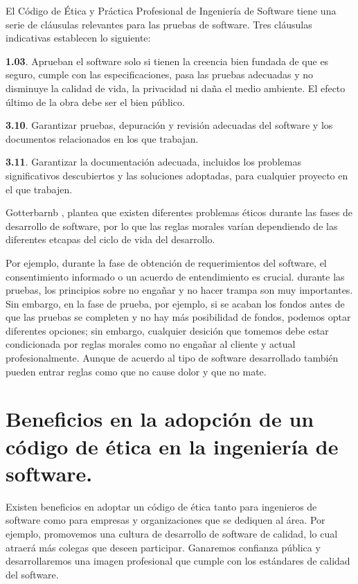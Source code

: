 \documentclass[twoside]{article}
\begin{document}
\begin{multicols}{2}
El Código de Ética y Práctica Profesional de Ingeniería de Software tiene una
serie de cláusulas relevantes para las pruebas de software. Tres cláusulas
indicativas establecen lo siguiente:

\textbf{1.03}. Aprueban el software solo si tienen la creencia bien fundada de que es
seguro, cumple con las especificaciones, pasa las pruebas adecuadas y no
disminuye la calidad de vida, la privacidad ni daña el medio ambiente. El efecto
último de la obra debe ser el bien público.

\textbf{3.10}. Garantizar pruebas, depuración y revisión adecuadas del software
y los documentos relacionados en los que trabajan.

\textbf{3.11}. Garantizar la documentación adecuada, incluidos los problemas
significativos descubiertos y las soluciones adoptadas, para cualquier proyecto
en el que trabajen.

Gotterbarnb \cite{gotterbarn2001software}, plantea que existen diferentes
problemas éticos durante las fases de desarrollo de software, por lo que las
reglas morales varían dependiendo de las diferentes etcapas del ciclo de vida
del desarrollo.

Por ejemplo, durante la fase de obtención de requerimientos del software, el
consentimiento informado o un acuerdo de entendimiento es crucial. durante las
pruebas, los principios sobre no engañar y no hacer trampa son muy importantes.
Sin embargo, en la fase de prueba, por ejemplo, si se acaban los fondos antes de
que las pruebas se completen y no hay más posibilidad de fondos, podemos optar
diferentes opciones; sin embargo, cualquier desición que tomemos debe estar
condicionada por reglas morales como no engañar al cliente y actual
profesionalmente. Aunque de acuerdo al tipo de software desarrollado también
pueden entrar reglas como que no cause dolor y que no mate.


\section{Beneficios en la adopción de un código de ética en la ingeniería de software.}

Existen beneficios en adoptar un código de ética tanto para ingenieros de
software como para empresas y organizaciones que se dediquen al área. Por
ejemplo, promovemos una cultura de desarrollo de software de calidad, lo cual
atraerá más colegas que deseen participar. Ganaremos confianza pública y
desarrollaremos una imagen profesional que cumple con los estándares de calidad
del software.



\end{multicols}
\end{document}
